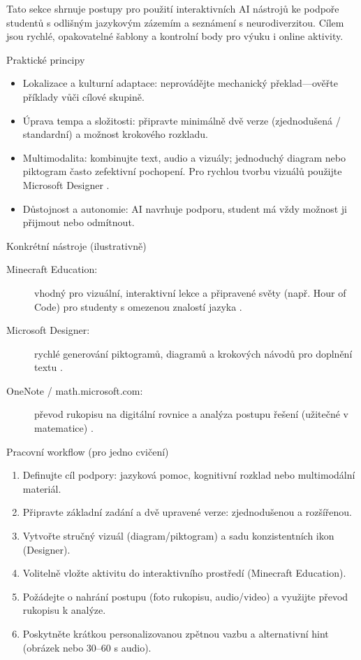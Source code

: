 Tato sekce shrnuje postupy pro použití interaktivních AI nástrojů ke podpoře studentů s odlišným jazykovým zázemím a seznámení s neurodiverzitou. Cílem jsou rychlé, opakovatelné šablony a kontrolní body pro výuku i online aktivity.

Praktické principy
\begin{itemize}
  \item Lokalizace a kulturní adaptace: neprovádějte mechanický překlad—ověřte příklady vůči cílové skupině.
  \item Úprava tempa a složitosti: připravte minimálně dvě verze (zjednodušená / standardní) a možnost krokového rozkladu.
  \item Multimodalita: kombinujte text, audio a vizuály; jednoduchý diagram nebo piktogram často zefektivní pochopení. Pro rychlou tvorbu vizuálů použijte Microsoft Designer \cite{kb_ai_101_tipu_pdf_04e4a115_page_51_1}.
  \item Důstojnost a autonomie: AI navrhuje podporu, student má vždy možnost ji přijmout nebo odmítnout.
\end{itemize}

Konkrétní nástroje (ilustrativně)
\begin{description}
  \item[Minecraft Education:] vhodný pro vizuální, interaktivní lekce a připravené světy (např. Hour of Code) pro studenty s omezenou znalostí jazyka \cite{kb_ai_101_tipu_pdf_04e4a115_page_15_2}.
  \item[Microsoft Designer:] rychlé generování piktogramů, diagramů a krokových návodů pro doplnění textu \cite{kb_ai_101_tipu_pdf_04e4a115_page_51_1}.
  \item[OneNote / math.microsoft.com:] převod rukopisu na digitální rovnice a analýza postupu řešení (užitečné v matematice) \cite{kb_ai_101_tipu_pdf_04e4a115_page_8_1}.
\end{description}

Pracovní workflow (pro jedno cvičení)
\begin{enumerate}
  \item Definujte cíl podpory: jazyková pomoc, kognitivní rozklad nebo multimodální materiál.
  \item Připravte základní zadání a dvě upravené verze: zjednodušenou a rozšířenou.
  \item Vytvořte stručný vizuál (diagram/piktogram) a sadu konzistentních ikon (Designer).
  \item Volitelně vložte aktivitu do interaktivního prostředí (Minecraft Education).
  \item Požádejte o nahrání postupu (foto rukopisu, audio/video) a využijte převod rukopisu k analýze.
  \item Poskytněte krátkou personalizovanou zpětnou vazbu a alternativní hint (obrázek nebo 30–60 s audio).
\end{enumerate}

